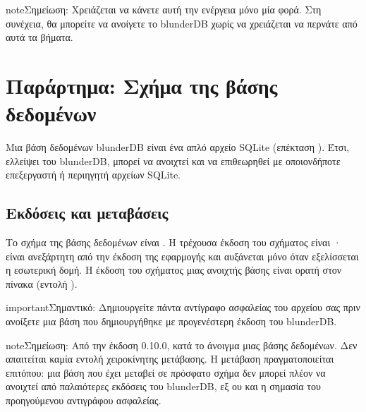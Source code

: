 \documentclass[letterpaper,10pt,greek]{sphinxmanual}
\begin{document}
\begin{sphinxadmonition}{note}{Σημείωση:}
\sphinxAtStartPar
Χρειάζεται να κάνετε αυτή την ενέργεια μόνο μία φορά. Στη συνέχεια, θα μπορείτε να ανοίγετε το blunderDB χωρίς να χρειάζεται να περνάτε από αυτά τα βήματα.
\end{sphinxadmonition}

\sphinxstepscope


\section{Παράρτημα: Σχήμα της βάσης δεδομένων}
\label{\detokenize{annexe_db_scheme:annexe-schema-de-la-base-de-donnees}}\label{\detokenize{annexe_db_scheme:annexe-db-migration}}\label{\detokenize{annexe_db_scheme::doc}}
\sphinxAtStartPar
Μια βάση δεδομένων blunderDB είναι ένα απλό αρχείο SQLite (επέκταση ). Έτσι, ελλείψει του blunderDB, μπορεί να ανοιχτεί και να επιθεωρηθεί με οποιονδήποτε επεξεργαστή ή περιηγητή αρχείων SQLite.


\subsection{Εκδόσεις και μεταβάσεις}
\label{\detokenize{annexe_db_scheme:versionnage-et-migrations}}
\sphinxAtStartPar
Το σχήμα της βάσης δεδομένων είναι . Η τρέχουσα έκδοση του σχήματος είναι · είναι ανεξάρτητη από την έκδοση της εφαρμογής και αυξάνεται μόνο όταν εξελίσσεται η εσωτερική δομή. Η έκδοση του σχήματος μιας ανοιχτής βάσης είναι ορατή στον πίνακα  (εντολή ).

\begin{sphinxadmonition}{important}{Σημαντικό:}
\sphinxAtStartPar
Δημιουργείτε πάντα αντίγραφο ασφαλείας του αρχείου  σας πριν ανοίξετε μια βάση που δημιουργήθηκε με προγενέστερη έκδοση του blunderDB.
\end{sphinxadmonition}

\begin{sphinxadmonition}{note}{Σημείωση:}
\sphinxAtStartPar
Από την έκδοση 0.10.0,  κατά το άνοιγμα μιας βάσης δεδομένων. Δεν απαιτείται καμία εντολή χειροκίνητης μετάβασης. Η μετάβαση πραγματοποιείται επιτόπου: μια βάση που έχει μεταβεί σε πρόσφατο σχήμα δεν μπορεί πλέον να ανοιχτεί από παλαιότερες εκδόσεις του blunderDB, εξ ου και η σημασία του προηγούμενου αντιγράφου ασφαλείας.
\end{sphinxadmonition}
\end{document}
